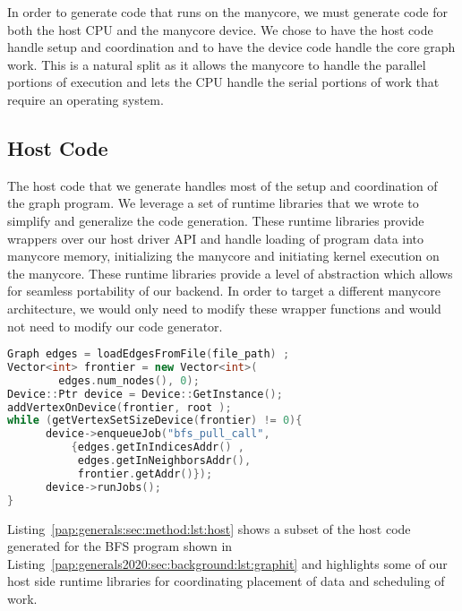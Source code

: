 In order to generate code that runs on the manycore, we must generate code for both the host CPU and the manycore device.
We chose to have the host code handle setup and coordination and to have the device code handle the core graph work.
This is a natural split as it allows the manycore to handle the parallel portions of execution and lets the CPU handle the serial portions of work that require an operating system.

\subsection{Host Code} 

The host code that we generate handles most of the setup and coordination of the graph program. 
We leverage a set of runtime libraries that we wrote to simplify and generalize the code generation. 
These runtime libraries provide wrappers over our host driver API and handle loading of program data into manycore memory, initializing the manycore and initiating kernel execution on the manycore. 
These runtime libraries provide a level of abstraction which allows for seamless portability of our backend. 
In order to target a different manycore architecture, we would only need to modify these wrapper functions and would not need to modify our code generator.
\newline
{}
\begin{lstlisting}[language=C++, breaklines=true, 
                   caption=Generated \hb host code for the Breadth-First Search (BFS) program shown in Listing~\ref{pap:generals2020:sec:background:lst:graphit}.,
                   label=pap:generals:sec:method:lst:host]
Graph edges = loadEdgesFromFile(file_path) ;
Vector<int> frontier = new Vector<int>(
        edges.num_nodes(), 0);
Device::Ptr device = Device::GetInstance();
addVertexOnDevice(frontier, root );
while (getVertexSetSizeDevice(frontier) != 0){
      device->enqueueJob("bfs_pull_call",
          {edges.getInIndicesAddr() , 
           edges.getInNeighborsAddr(), 
           frontier.getAddr()}); 
      device->runJobs();
}
\end{lstlisting}
Listing~\ref{pap:generals:sec:method:lst:host} shows a subset of the host code generated for the BFS program shown in Listing~\ref{pap:generals2020:sec:background:lst:graphit} and highlights some of our host side runtime libraries for coordinating placement of data and scheduling of work.

